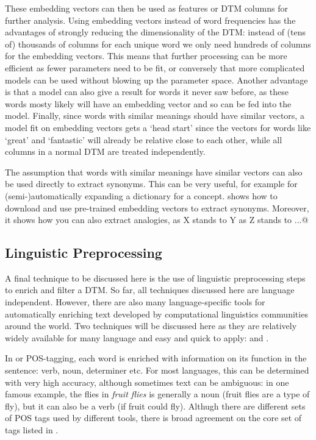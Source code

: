 These embedding vectors can then be used as features or DTM columns for further analysis.
Using embedding vectors instead of word frequencies has the advantages of strongly reducing the dimensionality of the DTM:
instead of (tens of) thousands of columns for each unique word we only need hundreds of columns for the embedding vectors.
This means that further processing can be more efficient as fewer parameters need to be fit,
or conversely that more complicated models can be used without blowing up the parameter space.
Another advantage is that a model can also give a result for words it never saw before, as these words mosty likely will have an embedding vector and so can be fed into the model.
Finally, since words with similar meanings should have similar vectors,
a model fit on embedding vectors gets a `head start' since the vectors for words like `great' and `fantastic' will already be relative close to each other, while all columns in a normal DTM are treated independently.

The assumption that words with similar meanings have similar vectors can also be used directly to extract synonyms.
This can be very useful, for example for (semi-)automatically expanding a dictionary for a concept.
 shows how to download and use pre-trained embedding vectors to extract synonyms.
Moreover, it shows how you can also extract analogies, as X stands to Y as Z stands to ...@



\subsection{Linguistic Preprocessing}
\label{sec:nlp}

A final technique to be discussed here is the use of linguistic preprocessing steps to enrich and filter a DTM.
So far, all techniques discussed here are language independent.
However, there are also many language-specific tools for automatically enriching text developed by computational linguistics communities around the world.
Two techniques will be discussed here as they are relatively widely available for many language and easy and quick to apply:  and .

In  or POS-tagging, each word is enriched with information on its function in the sentence: verb, noun, determiner etc.
For most languages, this can be determined with very high accuracy, although sometimes text can be ambiguous:
in one famous example, the flies in \emph{fruit flies} is generally a noun (fruit flies are a type of fly), but it can also be a verb (if fruit could fly). 
Althugh there are different sets of POS tags used by different tools, there is broad agreement on the core set of tags listed in .

